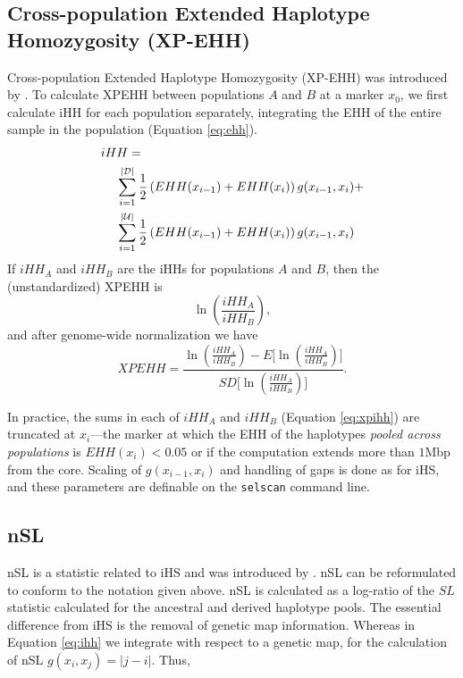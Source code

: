 \documentclass[12pt]{article}%
\newcommand{\negspace}{\!\!\!\!\!\!\!\!\!\!\!\!}
\begin{document}
\subsection{Cross-population Extended Haplotype Homozygosity (XP-EHH)}\label{sec:xpehh}

Cross-population Extended Haplotype Homozygosity (XP-EHH) was introduced by \cite{SabetiEtAl07}. To calculate XPEHH between populations $A$ and $B$ at a marker $x_0$, we first calculate iHH for each population separately, integrating the EHH of the entire sample in the population (Equation \ref{eq:ehh}).
\begin{align}\label{eq:xpihh}
iHH =&\notag\\
&\negspace\sum_{i = 1}^{|\mathcal{D}|} \frac{1}{2}\left(EHH(x_{i-1}) + EHH(x_i)\right)g(x_{i-1},x_i) + \notag\\
&\negspace\sum_{i = 1}^{|\mathcal{U}|} \frac{1}{2}\left(EHH(x_{i-1}) + EHH(x_i)\right)g(x_{i-1},x_i)
\end{align}
If $iHH_A$ and $iHH_B$ are the iHHs for populations $A$ and $B$, then the 
(unstandardized) XPEHH is
\begin{equation}
\ln\left(\frac{iHH_A}{iHH_B}\right),
\end{equation}
and after genome-wide normalization we have
\begin{equation}
XPEHH = \frac{\ln\left(\frac{iHH_A}{iHH_B}\right) - E\Big[\ln\left(\frac{iHH_A}{iHH_B}\right)\Big]}{SD\Big[\ln\left(\frac{iHH_A}{iHH_B}\right)\Big]}.
\end{equation}

In practice, the sums in each of $iHH_A$ and $iHH_B$ (Equation \ref{eq:xpihh}) 
are truncated at $x_i$---the marker at which the EHH of the haplotypes {\it 
pooled across populations} is $EHH(x_i) < 0.05$ or if the computation extends more than $1$Mbp from the core.  Scaling of $g(x_{i-1},x_i)$ 
and handling of gaps is done as for iHS, and these parameters are definable 
on the {\tt selscan} command line.

\subsection{nSL}\label{sec:nsl}

nSL is a statistic related to iHS and was introduced by \cite{FerrerAdmetllaEtAl14}.  nSL can be reformulated to conform to the notation given above.  nSL is calculated as a log-ratio of the $SL$ statistic calculated for the ancestral and derived haplotype pools.  The essential difference from iHS is the removal of genetic map information.  Whereas in Equation \ref{eq:ihh} we integrate with respect to a genetic map, for the calculation of nSL $g(x_i,x_j) = |j-i|$.  Thus,
\end{document}
